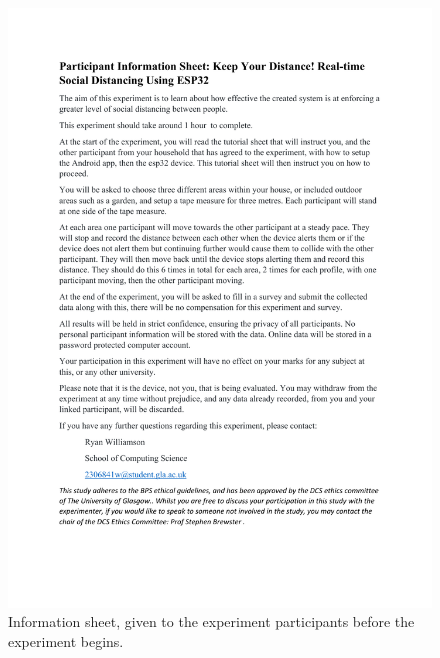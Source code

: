 \documentclass{l4proj}
\begin{document}
\begin{appendices}
    \begin{figure}[!htb]
        \centering
        \includegraphics[width=1.0\linewidth]{images/Participant Information Sheet.pdf}

        \caption{ Information sheet, given to the experiment participants before the experiment begins. }

        \label{fig:participant_information}
    \end{figure}


\end{appendices}
\end{document}
